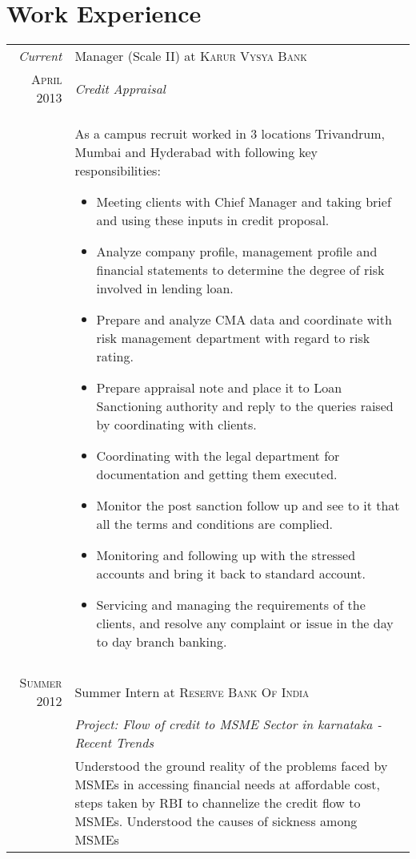 \documentclass[a4paper,10pt]{article}
\begin{document}
\section{Work Experience}
\begin{tabular}{r|p{11cm}}
 \emph{Current} & Manager (Scale II) at \textsc{Karur Vysya Bank}  \\\textsc{April 2013}&\emph{Credit Appraisal}\\&\footnotesize{As a campus recruit worked in 3 locations Trivandrum, Mumbai and Hyderabad with following key responsibilities:\begin{itemize}
 \item Meeting clients with Chief Manager and taking brief and using these inputs in credit proposal.
 \item Analyze company profile, management profile and financial statements to determine the degree of risk involved in lending loan.
 \item Prepare and analyze CMA data and coordinate with risk management department with regard to risk rating.
 \item Prepare appraisal note and place it to Loan Sanctioning authority and reply to the queries raised by coordinating with clients.
 \item Coordinating with the legal department for documentation and getting them executed.
 \item Monitor the post sanction follow up and see to it that all the terms and conditions are complied.
 \item Monitoring and following up with the stressed accounts and bring it back to standard account.
 \item Servicing and managing the requirements of the clients, and resolve any complaint or issue in the day to day branch banking.\end{itemize}}
 \\\multicolumn{2}{c}{} \\
\textsc{Summer 2012} & Summer Intern at \textsc{Reserve Bank Of India} \emph{}\\\textsc{}&\emph{Project: Flow of credit to MSME Sector in karnataka - Recent Trends}\\&\footnotesize{Understood the ground reality of the problems faced by MSMEs in accessing financial needs at affordable cost, steps taken by RBI to channelize the credit flow to MSMEs. Understood the causes of sickness among MSMEs}
\end{tabular}
\end{document}
